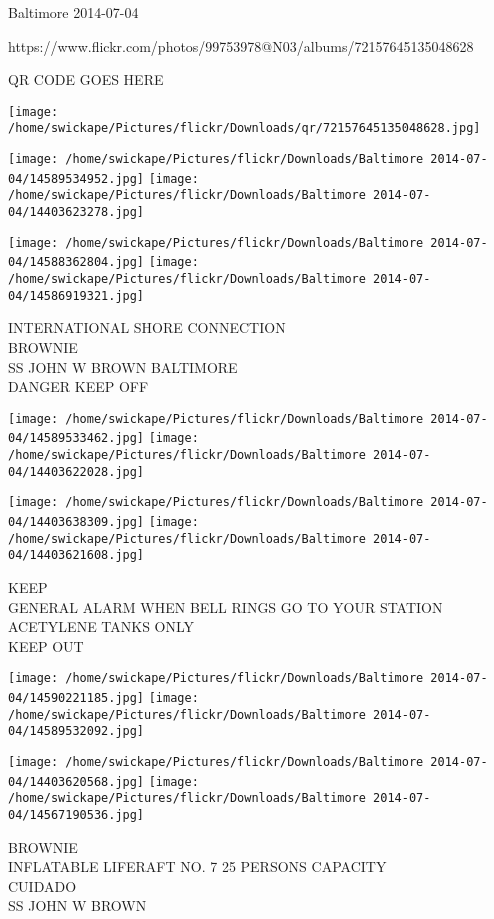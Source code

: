 \documentclass[10pt,letterpaper]{article}
\begin{document}
Baltimore 2014-07-04

https://www.flickr.com/photos/99753978@N03/albums/72157645135048628

QR CODE GOES HERE

\texttt{[image: /home/swickape/Pictures/flickr/Downloads/qr/72157645135048628.jpg]}
\pagebreak

\texttt{[image: /home/swickape/Pictures/flickr/Downloads/Baltimore 2014-07-04/14589534952.jpg]}
\texttt{[image: /home/swickape/Pictures/flickr/Downloads/Baltimore 2014-07-04/14403623278.jpg]}

\texttt{[image: /home/swickape/Pictures/flickr/Downloads/Baltimore 2014-07-04/14588362804.jpg]}
\texttt{[image: /home/swickape/Pictures/flickr/Downloads/Baltimore 2014-07-04/14586919321.jpg]}

INTERNATIONAL SHORE CONNECTION\\
BROWNIE\\
SS JOHN W BROWN BALTIMORE\\
DANGER KEEP OFF\\
\pagebreak

\texttt{[image: /home/swickape/Pictures/flickr/Downloads/Baltimore 2014-07-04/14589533462.jpg]}
\texttt{[image: /home/swickape/Pictures/flickr/Downloads/Baltimore 2014-07-04/14403622028.jpg]}

\texttt{[image: /home/swickape/Pictures/flickr/Downloads/Baltimore 2014-07-04/14403638309.jpg]}
\texttt{[image: /home/swickape/Pictures/flickr/Downloads/Baltimore 2014-07-04/14403621608.jpg]}

KEEP\\
GENERAL ALARM WHEN BELL RINGS GO TO YOUR STATION\\
ACETYLENE TANKS ONLY\\
KEEP OUT\\
\pagebreak

\texttt{[image: /home/swickape/Pictures/flickr/Downloads/Baltimore 2014-07-04/14590221185.jpg]}
\texttt{[image: /home/swickape/Pictures/flickr/Downloads/Baltimore 2014-07-04/14589532092.jpg]}

\texttt{[image: /home/swickape/Pictures/flickr/Downloads/Baltimore 2014-07-04/14403620568.jpg]}
\texttt{[image: /home/swickape/Pictures/flickr/Downloads/Baltimore 2014-07-04/14567190536.jpg]}

BROWNIE\\
INFLATABLE LIFERAFT NO. 7 25 PERSONS CAPACITY\\
CUIDADO\\
SS JOHN W BROWN\\
\pagebreak
\end{document}
